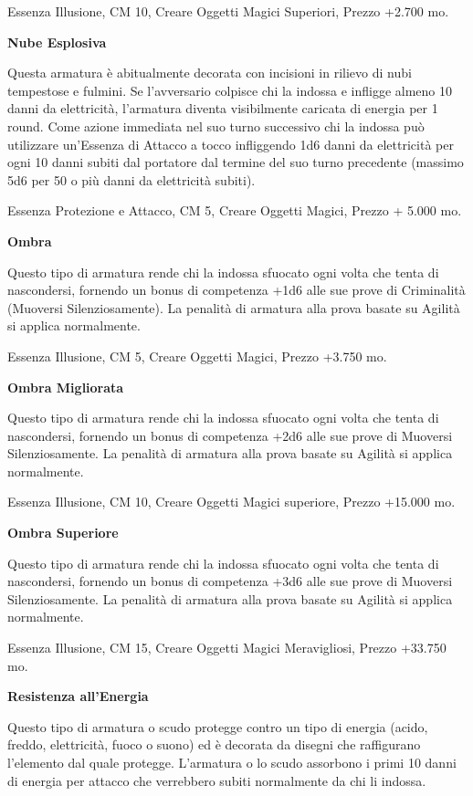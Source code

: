 \documentclass[a4paper,11pt,twoside,openany]{book}
\begin{document}
Essenza Illusione, CM 10, Creare Oggetti Magici Superiori, Prezzo +2.700 mo.

\textbf{Nube Esplosiva}

Questa armatura è abitualmente decorata con incisioni in rilievo di nubi tempestose e fulmini. Se l'avversario colpisce chi la indossa e infligge almeno 10 danni da elettricità, l'armatura diventa visibilmente caricata di energia per 1 round. Come azione immediata nel suo turno successivo chi la indossa può utilizzare un'Essenza di Attacco a tocco infliggendo 1d6 danni da elettricità per ogni 10 danni subiti dal portatore dal termine del suo turno precedente (massimo 5d6 per 50 o più danni da elettricità subiti).

Essenza Protezione e Attacco, CM 5, Creare Oggetti Magici, Prezzo
+ 5.000 mo.

\textbf{Ombra}

Questo tipo di armatura rende chi la indossa sfuocato ogni volta che tenta di nascondersi, fornendo un bonus di competenza +1d6 alle sue prove di Criminalità (Muoversi Silenziosamente). La penalità di armatura alla prova basate su Agilità si applica normalmente.

Essenza Illusione, CM 5, Creare Oggetti Magici, Prezzo +3.750 mo.

\textbf{Ombra Migliorata}

Questo tipo di armatura rende chi la indossa sfuocato ogni volta che tenta di nascondersi, fornendo un bonus di competenza +2d6 alle sue prove di Muoversi Silenziosamente. La penalità di armatura alla prova basate su Agilità si applica normalmente.

Essenza Illusione, CM 10, Creare Oggetti Magici superiore, Prezzo
+15.000 mo.

\textbf{Ombra Superiore}

Questo tipo di armatura rende chi la indossa sfuocato ogni volta che
tenta di nascondersi, fornendo un bonus di competenza +3d6 alle sue
prove di Muoversi Silenziosamente. La penalità di armatura alla prova
basate su Agilità si applica normalmente.

Essenza Illusione, CM 15, Creare Oggetti Magici Meravigliosi, Prezzo
+33.750 mo.

\textbf{Resistenza all'Energia}

Questo tipo di armatura o scudo protegge contro un tipo di energia (acido, freddo, elettricità, fuoco o suono) ed è decorata da disegni che raffigurano l'elemento dal quale protegge. L'armatura o lo scudo assorbono i primi 10 danni di energia per attacco che verrebbero subiti normalmente da chi li indossa.
\end{document}
